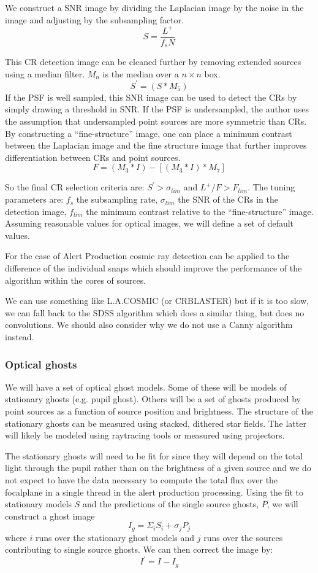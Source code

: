 We construct a SNR image by dividing the Laplacian image by the noise in the image and adjusting by the subsampling factor.
\[
S = \frac{L^+}{f_s N}
\]

This CR detection image can be cleaned further by removing extended sources using a median filter. $M_n$ is the median over a $n \times n$ box.
\[
S^\prime = (S \ast M_5)
\]
If the PSF is well sampled, this SNR image can be used to detect the CRs by simply drawing a threshold in SNR.
If the PSF is undersampled, the author uses the assumption that undersampled point sources are more symmetric
than CRs.  By constructing a ``fine-structure'' image, one can place a minimum contrast between the Laplacian image and the fine structure image that further improves differentiation between CRs and point sources.
\[
F = (M_3 \ast I) - [(M_3 \ast I) \ast M_7]
\]

So the final CR selection criteria are: $S^\prime > \sigma_{lim}$ and $L^+/F > F_{lim}$.  The tuning
parameters are: $f_s$ the subsampling rate, $\sigma_{lim}$ the SNR of the CRs in the detection image,
$f_{lim}$ the minimum contrast relative to the ``fine-structure'' image. Assuming reasonable values for optical
images, we will define a set of default values.

For the case of Alert Production cosmic ray detection can be applied to the difference of the individual snaps which should improve the performance of the algorithm within the cores of sources.


\begin{note}
We can use something like L.A.COSMIC (or CRBLASTER) but if it is too slow, we can fall back to the SDSS algorithm which does a similar thing, but does no convolutions.
We should also consider why we do not use a Canny algorithm instead.
\end{note}

\subsubsection{Optical ghosts}
We will have a set of optical ghost models.  Some of these will be models of stationary ghosts (e.g. pupil
ghost). Others will be a set of ghosts produced by point sources as a function of source position and
brightness. The structure of the stationary ghosts can be measured using stacked, dithered star fields.  The latter will likely be modeled using raytracing tools or measured using projectors.

The stationary ghosts will need to be fit for since they will depend on the total light through the pupil rather than on the brightness of a given source and we do not expect to have the data necessary to compute the total flux over the focalplane in a single thread in the alert production processing.  Using the fit to stationary models $S$ and the predictions of the single source ghosts, $P$, we will construct a ghost image
\[
I_g = \Sigma_i S_i + \sigma_j P_{j}
\]
where $i$ runs over the stationary ghost models and $j$ runs over the sources contributing to single source ghosts.  We can then correct the image by:
\[
I^\prime = I - I_g
\]

